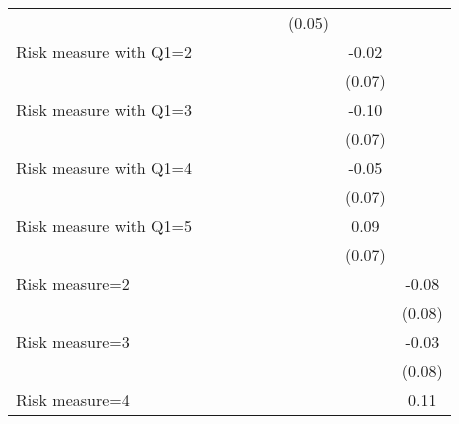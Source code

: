 \begin{table}[htbp]
\begin{threeparttable}
\begin{tabular}{l cccccccc}
                    &               &               &               &               &               &      (0.05)   &               &               \\
Risk measure with Q1=2&               &               &               &               &               &               &       -0.02   &               \\
                    &               &               &               &               &               &               &      (0.07)   &               \\
Risk measure with Q1=3&               &               &               &               &               &               &       -0.10   &               \\
                    &               &               &               &               &               &               &      (0.07)   &               \\
Risk measure with Q1=4&               &               &               &               &               &               &       -0.05   &               \\
                    &               &               &               &               &               &               &      (0.07)   &               \\
Risk measure with Q1=5&               &               &               &               &               &               &        0.09   &               \\
                    &               &               &               &               &               &               &      (0.07)   &               \\
Risk measure=2      &               &               &               &               &               &               &               &       -0.08   \\
                    &               &               &               &               &               &               &               &      (0.08)   \\
Risk measure=3      &               &               &               &               &               &               &               &       -0.03   \\
                    &               &               &               &               &               &               &               &      (0.08)   \\
Risk measure=4      &               &               &               &               &               &               &               &        0.11   \\

\end{tabular}
\end{threeparttable}
\end{table}
